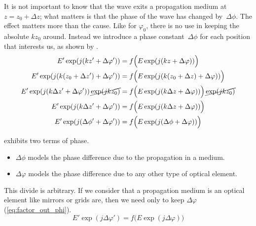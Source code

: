 It is not important to know that the wave exits a propagation medium at~$z=z_0 + \Delta z$;
what matters is that the phase of the wave has changed by~$\Delta\phi$.
The effect matters more than the cause.
Like for $\varphi_0$, there is no use in keeping the absolute $kz_0$ around.
Instead we introduce a phase constant~$\Delta\phi$ for each position that interests us, as shown by .
\begin{align}
    E' \exp(j(kz'+\Delta\varphi'))
    &=
    f\Big(
        E \exp(j(kz+\Delta\varphi))
    \Big)
    \label{eq:factor_out_kz0_0}
    \\
    E' \exp(j(k(z_0 + \Delta z')+\Delta\varphi'))
    &=
    f\Big(
        E \exp(j(k(z_0 + \Delta z)+\Delta\varphi))
    \Big)
    \label{eq:factor_out_kz0_1}
    \\
    E' \exp(j(k\Delta z'+\Delta\varphi')) \,\cancel{\exp(jkz_0)}
    &=
    f\Big(
        E \exp(j(k\Delta z+\Delta\varphi))
    \Big)
    \,\cancel{\exp(jkz_0)}
    \label{eq:factor_out_kz0_2}
    \\
    E' \exp(j(k\Delta z'+\Delta\varphi'))
    &=
    f\Big(
        E \exp(j(k\Delta z+\Delta\varphi))
    \Big)
    \label{eq:factor_out_kz0_3}
    \\
    E' \exp(j(\Delta\phi'+\Delta\varphi'))
    &=
    f\Big(
        E \exp(j(\Delta\phi+\Delta\varphi))
    \Big)
    \label{eq:factor_out_kz0_4}
\end{align}

 exhibits two terms of phase.
\begin{itemize}
    \item $\Delta\phi$ models the phase difference due to the propagation in a medium.
    \item $\Delta\varphi$ models the phase difference due to any other type of optical element.
\end{itemize}
This divide is arbitrary.
If we consider that a propagation medium is an optical element like mirrors or grids are, then we need only to keep $\Delta\varphi$ (\cref{eq:factor_out_phi}).
\begin{equation}
    E' \exp(j\Delta\varphi') = f\Big( E \exp(j\Delta\varphi) \Big)
    \label{eq:factor_out_phi}
\end{equation}

